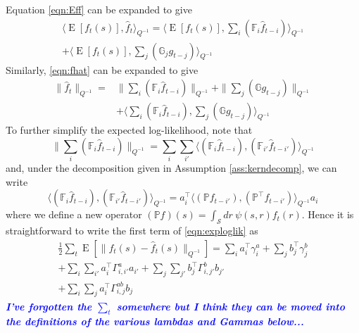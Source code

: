 \documentclass{IEEEtran}
\newcommand{\todo}[1]{\textsf{\emph{\textbf{\textcolor{blue}{#1}}}}}
\newcommand{\inner}[3]{\langle#1,#2\rangle_{#3}}
\newcommand{\dist}[2]{\|#1\|_{#2}}
\DeclareMathOperator{\E}{E}
\begin{document}
Equation \ref{eqn:Eff} can be expanded to give
\begin{equation}
	\begin{split}
	\inner{\E[f_t(s)]}{\hat{f}_t}{Q^{-1}} 
	 = \inner
		{\E[f_t(s)]}
		{\sum_i(\mathbb{F}_i\hat{f}_{t-i})}
		{Q^{-1}} \\
	+ \inner
		{\E[f_t(s)]}
		{\sum_j(\mathbb{G}_jg_{t-j})}
		{Q^{-1}}
	\end{split}
\end{equation}
Similarly, \ref{eqn:fhat} can be expanded to give
\begin{equation}
	\begin{split}
	\dist
		{\hat{f}_t}
		{Q^{-1}} 
	= & \dist
		{\sum_i(\mathbb{F}_i\hat{f}_{t-i})}
		{Q^{-1}} 
	+ \dist
		{\sum_j(\mathbb{G}g_{t-j})}
		{Q^{-1}}\\
	& + \inner
		{\sum_i(\mathbb{F}_i\hat{f}_{t-i})}
		{\sum_j(\mathbb{G}g_{t-j})}
		{Q^{-1}}
	\end{split}
\end{equation}
To further simplify the expected log-likelihood, note that
\begin{equation}
	\dist{\sum_i(\mathbb{F}_i\hat{f}_{t-i})}
	{Q^{-1}} = 
	\sum_i \sum_{i'} \inner
		{(\mathbb{F}_i\hat{f}_{t-i})}
		{(\mathbb{F}_{i'}\hat{f}_{t-i'})}
		{Q^{-1}}
\end{equation}
and, under the decomposition given in Assumption \ref{ass:kerndecomp}, we can write
\begin{equation}
	\inner
		{(\mathbb{F}_i\hat{f}_{t-i})}
		{(\mathbb{F}_{i'}\hat{f}_{t-i'})}
		{Q^{-1}} =  
	 a_i^\top \inner 
		{(\mathbb{P} f_{t-i'})}
		{(\mathbb{P}^\top f_{t-i'}) }
		{Q^{-1}} a_i
\end{equation}
where we define a new operator $(\mathbb{P} f)(s) = \int_\mathcal{S}dr~\psi(s,r)f_t(r)$. Hence it is straightforward to write the first term of \ref{eqn:exploglik} as
\begin{equation}
	\label{eqn:norm_x_error}
	\begin{split}
	\frac{1}{2}\sum_t\E[\dist{f_t(s) - \hat{f}_t(s)}{Q^{-1}}] = 
		\sum_i a_i^\top \gamma^a_i + \sum_j b_j^\top \gamma^b_j \\
		+ \sum_i\sum_{i'}a_i^\top \Gamma_{i,i'}^a
		a_{i'} 
		+ \sum_j\sum_{j'}b_j^\top \Gamma_{i,j'}^b
		b_{j'} \\
		+ \sum_i\sum_{j}a_i^\top \Gamma_{i,j}^{ab}
		b_j
		\end{split}
\end{equation}
\todo{I've forgotten the $\sum_t$ somewhere but I think they can be moved into the definitions of the various lambdas and Gammas below...}
\end{document}
